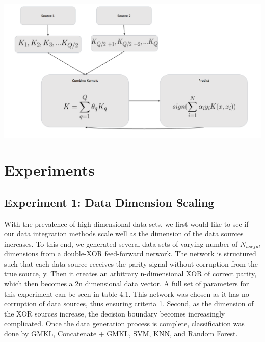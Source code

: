 \documentclass{article}
\begin{document}
\begin{minipage}{\linewidth}
\begin{center}
\includegraphics[scale=.4]{implementation_flowchart.png}
\end{center}
\end{minipage}














\section*{Experiments}



\subsection*{Experiment 1: Data Dimension Scaling}
With the prevalence of high dimensional data sets, we first would like to see
if our data integration methods scale well as the dimension of the data sources
increases. To this end, we generated several data sets of varying number of
$N_{useful}$ dimensions from a double-XOR feed-forward network. The network is
structured such that each data source receives the parity signal without
corruption from the true source, y. Then it creates an arbitrary n-dimensional
XOR of correct parity, which then becomes a 2n dimensional data vector.  A full
set of parameters for this experiment can be seen in table 4.1. This network was
chosen as it has no corruption of data sources, thus ensuring criteria 1.
Second, as the dimension of the XOR sources increase, the decision boundary becomes
increasingly complicated. Once the data generation process is complete,
classification was done by GMKL, Concatenate + GMKL, SVM, KNN, and Random
Forest.
\end{document}
